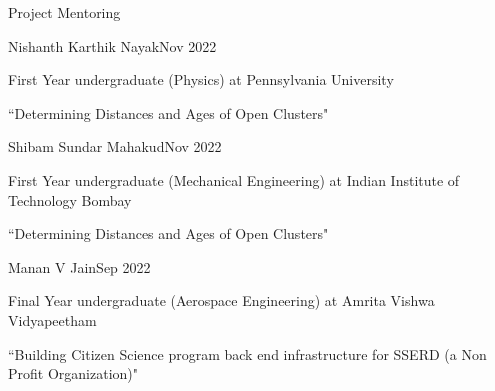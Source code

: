 \begin{rSection}{Project Mentoring}
\begin{rSubsection}{Nishanth Karthik Nayak}{Nov 2022}{}{}
\vspace{-0.5em}
\item []First Year undergraduate (Physics) at Pennsylvania University 
\item []``Determining Distances and Ages of Open Clusters"
\end{rSubsection}

\vspace{-0.5em}

\begin{rSubsection}{Shibam Sundar Mahakud}{Nov 2022}{}{}
\vspace{-0.5em}
\item []First Year undergraduate (Mechanical Engineering) at Indian Institute of Technology Bombay
\item []``Determining Distances and Ages of Open Clusters"
\end{rSubsection}

\vspace{-0.5em}

\begin{rSubsection}{Manan V Jain}{Sep 2022}{}{}
\vspace{-0.5em}
\item []Final Year undergraduate (Aerospace Engineering) at Amrita Vishwa Vidyapeetham
\item []``Building Citizen Science program back end infrastructure for SSERD (a Non Profit Organization)"
\end{rSubsection}
\end{rSection}